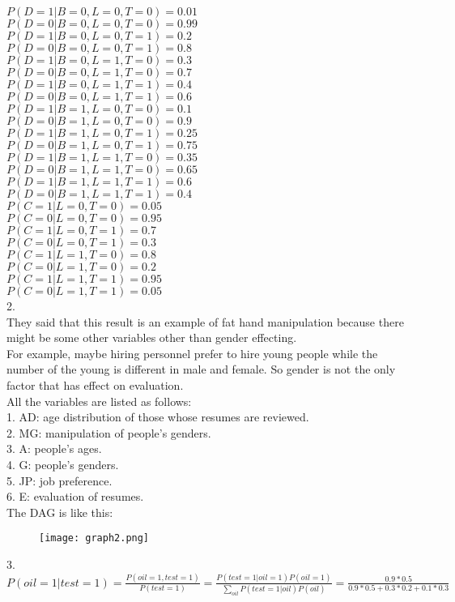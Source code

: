 \documentclass[a4paper]{article}
\begin{document}
$P(D=1|B=0,L=0,T=0) = 0.01$\\
$P(D=0|B=0,L=0,T=0) = 0.99$\\
$P(D=1|B=0,L=0,T=1) = 0.2$\\
$P(D=0|B=0,L=0,T=1) = 0.8$\\
$P(D=1|B=0,L=1,T=0) = 0.3$\\
$P(D=0|B=0,L=1,T=0) = 0.7$\\
$P(D=1|B=0,L=1,T=1) = 0.4$\\
$P(D=0|B=0,L=1,T=1) = 0.6$\\
$P(D=1|B=1,L=0,T=0) = 0.1$\\
$P(D=0|B=1,L=0,T=0) = 0.9$\\
$P(D=1|B=1,L=0,T=1) = 0.25$\\
$P(D=0|B=1,L=0,T=1) = 0.75$\\
$P(D=1|B=1,L=1,T=0) = 0.35$\\
$P(D=0|B=1,L=1,T=0) = 0.65$\\
$P(D=1|B=1,L=1,T=1) = 0.6$\\
$P(D=0|B=1,L=1,T=1) = 0.4$\\

$P(C=1|L=0,T=0) = 0.05$\\
$P(C=0|L=0,T=0) = 0.95$\\
$P(C=1|L=0,T=1) = 0.7$\\
$P(C=0|L=0,T=1) = 0.3$\\
$P(C=1|L=1,T=0) = 0.8$\\
$P(C=0|L=1,T=0) = 0.2$\\
$P(C=1|L=1,T=1) = 0.95$\\
$P(C=0|L=1,T=1) = 0.05$\\

2. \\
They said that this result is an example of fat hand manipulation because there might be some other variables other than gender effecting.\\
For example, maybe hiring personnel prefer to hire young people while the number of the young is different in male and female. So gender is not the only factor that has effect on evaluation.\\
All the variables are listed as follows:\\
1. AD: age distribution of those whose resumes are reviewed.\\
2. MG: manipulation of people's genders.\\
3. A: people's ages.\\
4. G: people's genders.\\
5. JP: job preference.\\
6. E: evaluation of resumes.\\
The DAG is like this:
\begin{figure}[htbp]
\centering
\texttt{[image: graph2.png]}
\end{figure}

3. \\
$P(oil=1|test=1)=\frac{P(oil=1,test=1)}{P(test=1)}=\frac{P(test=1|oil=1)P(oil=1)}{\sum\limits_{oil} P(test=1|oil)P(oil)}=\frac{0.9*0.5}{0.9*0.5+0.3*0.2+0.1*0.3}$
\end{document}
